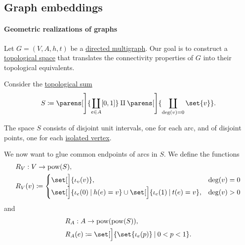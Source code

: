 \subsection{Graph embeddings}\label{subsec:graph_embeddings}

\paragraph{Geometric realizations of graphs}

\begin{definition}\label{def:graph_geometric_realization}\mimprovised
  Let \( G = (V, A, h, t) \) be a \hyperref[def:directed_multigraph]{directed multigraph}. Our goal is to construct a \hyperref[def:topological_space]{topological space} that translates the connectivity properties of \( G \) into their topological equivalents.

  Consider the \hyperref[def:topological_sum]{topological sum}
  \begin{equation*}
    S \coloneqq \parens[\Bigg]{ \coprod_{e \in A} [0, 1] } \amalg \parens[\Bigg]{ \coprod_{\deg(v) = 0} \set{ v } }.
  \end{equation*}

  The space \( S \) consists of disjoint unit intervals, one for each arc, and of disjoint points, one for each \hyperref[def:graph_cardinality/directed_degree]{isolated vertex}.

  We now want to glue common endpoints of arcs in \( S \). We define the functions
  \begin{equation}\label{eq:def:graph_geometric_realization/rv}
    \begin{aligned}
      &R_V: V \to \pow(S), \\
      &R_V(v) \coloneqq \begin{cases}
        \set[\Big]{ \iota_v(v) },                                                           &\deg(v) = 0 \\
        \set[\Big]{ \iota_e(0) \given h(e) = v } \cup \set[\Big]{ \iota_e(1) \given t(e) = v }, &\deg(v) > 0
      \end{cases}
    \end{aligned}
  \end{equation}
  and
  \begin{equation}\label{eq:def:graph_geometric_realization/ra}
    \begin{aligned}
      &R_A: A \to \pow(\pow(S)), \\
      &R_A(e) \coloneqq \set[\Big]{ \set{ \iota_e(p) } \given 0 < p < 1 }.
    \end{aligned}
  \end{equation}


\end{definition}
